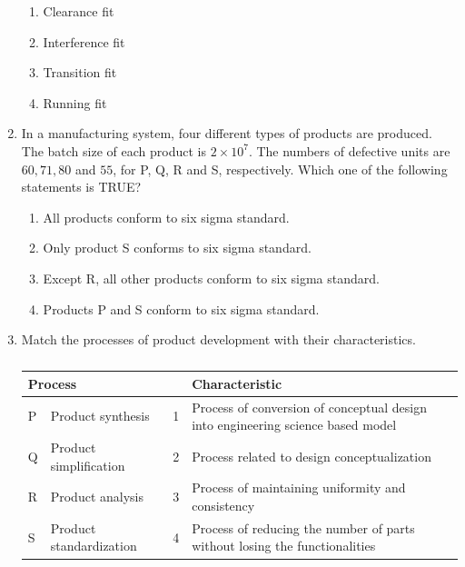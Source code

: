 \documentclass[journal,12pt,onecolumn]{IEEEtran}
\theoremstyle{remark}
\begin{document}
\begin{enumerate}
    \hfill{}
    \begin{enumerate}
        \item Clearance fit
        \item Interference fit
        \item Transition fit
        \item Running fit
    \end{enumerate}

    \item In a manufacturing system, four different types of products  are produced. The batch size of each product is $2 \times 10^{7}$. The numbers of defective units are $60, 71, 80$ and $55$, for P, Q, R and S, respectively. Which one of the following statements is TRUE?

    \hfill{}
    \begin{enumerate}
        \item All products conform to six sigma standard.
        \item Only product S conforms to six sigma standard.
        \item Except R, all other products conform to six sigma standard.
        \item Products P and S conform to six sigma standard.
    \end{enumerate}

    \item Match the processes of product development with their characteristics.
    \begin{table}[h]
        \centering
        \caption*{}
        \label{tab:q44}
        \begin{tabular}{llcl}
            \hline
            \multicolumn{2}{l}{Process} & & Characteristic \\
            \hline
            P & Product synthesis & 1 & Process of conversion of conceptual design into engineering science based model \\
            Q & Product simplification & 2 & Process related to design conceptualization \\
            R & Product analysis & 3 & Process of maintaining uniformity and consistency \\
            S & Product standardization & 4 & Process of reducing the number of parts without losing the functionalities \\
            \hline
        \end{tabular}
    \end{table}


\end{enumerate}
\end{document}
